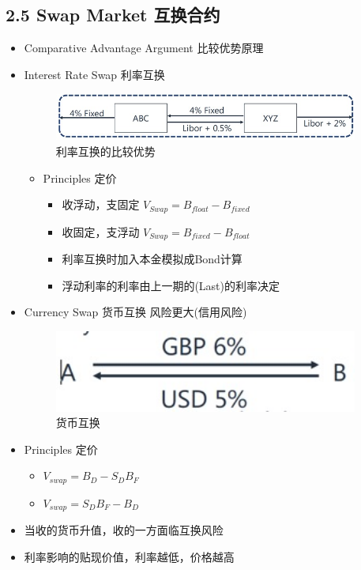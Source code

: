 \documentclass[a4paper,6pt,twoside,openany]{article}
\begin{document}
\subsection*{2.5 Swap Market 互换合约}
\begin{itemize}
\item Comparative Advantage Argument 比较优势原理
\item Interest Rate Swap 利率互换
  \begin{figure}[!htbp]
    \centering \includegraphics[width=100mm]{figures/Swap_Interest.jpg}
    \caption{利率互换的比较优势}
  \end{figure}
  \begin{itemize}
  \item Principles 定价
    \begin{itemize}
    \item 收浮动，支固定 $V_{Swap} = B_{float} - B_{fixed}$
    \item 收固定，支浮动 $V_{Swap} = B_{fixed} - B_{float}$
    \item 利率互换时加入本金模拟成Bond计算
    \item 浮动利率的利率由上一期的(Last)的利率决定
    \end{itemize}
  \end{itemize}
\item Currency Swap 货币互换 风险更大(信用风险)
\begin{figure}[!htbp]
  \centering \includegraphics[width=100mm]{figures/Swap_Currency.jpg}
  \caption{货币互换}
\end{figure}
  \item Principles 定价
    \begin{itemize}
    \item $V_{swap} = B_D - S_DB_F$
    \item $V_{swap} = S_DB_F - B_D$
    \end{itemize}
  \item 当收的货币升值，收的一方面临互换风险
  \item 利率影响的贴现价值，利率越低，价格越高
\end{itemize}
\end{document}
